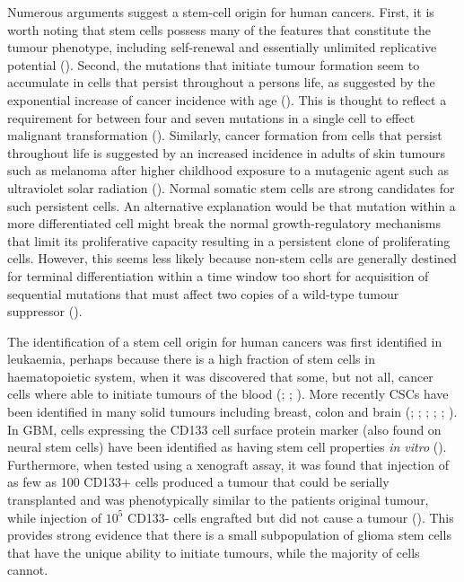 \documentclass[
  letterpaper,
]{scrreprt}
\theoremstyle{definition}
\theoremstyle{remark}
\begin{document}
Numerous arguments suggest a stem-cell origin for human cancers. First,
it is worth noting that stem cells possess many of the features that
constitute the tumour phenotype, including self-renewal and essentially
unlimited replicative potential (). Second, the mutations that initiate tumour formation
seem to accumulate in cells that persist throughout a persons life, as
suggested by the exponential increase of cancer incidence with age
(). This is thought to reflect
a requirement for between four and seven mutations in a single cell to
effect malignant transformation (). Similarly, cancer formation from cells that persist
throughout life is suggested by an increased incidence in adults of skin
tumours such as melanoma after higher childhood exposure to a mutagenic
agent such as ultraviolet solar radiation (). Normal somatic stem cells are strong candidates for such
persistent cells. An alternative explanation would be that mutation
within a more differentiated cell might break the normal
growth-regulatory mechanisms that limit its proliferative capacity
resulting in a persistent clone of proliferating cells. However, this
seems less likely because non-stem cells are generally destined for
terminal differentiation within a time window too short for acquisition
of sequential mutations that must affect two copies of a wild-type
tumour suppressor ().

The identification of a stem cell origin for human cancers was first
identified in leukaemia, perhaps because there is a high fraction of
stem cells in haematopoietic system, when it was discovered that some,
but not all, cancer cells where able to initiate tumours of the blood
(;
;
). More recently CSCs
have been identified in many solid tumours including breast, colon and
brain (;
;
;
;
;
). In GBM, cells expressing
the CD133 cell surface protein marker (also found on neural stem cells)
have been identified as having stem cell properties \emph{in vitro}
(). Furthermore, when tested
using a xenograft assay, it was found that injection of as few as 100
CD133+ cells produced a tumour that could be serially transplanted and
was phenotypically similar to the patients original tumour, while
injection of \(10^5\) CD133- cells engrafted but did not cause a tumour
(). This provides strong
evidence that there is a small subpopulation of glioma stem cells that
have the unique ability to initiate tumours, while the majority of cells
cannot.
\end{document}
